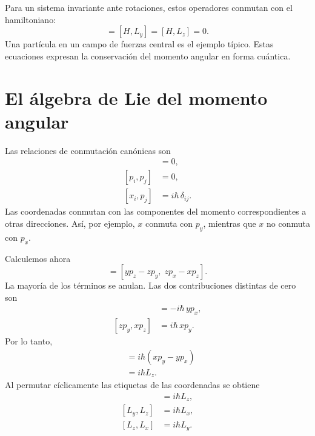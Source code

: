 Para un sistema invariante ante rotaciones, estos operadores conmutan con el hamiltoniano:
\begin{equation}
[H,L_x]=[H,L_y]=[H,L_z]=0.
\end{equation}
Una partícula en un campo de fuerzas central es el ejemplo típico. Estas ecuaciones expresan la conservación del momento angular en forma cuántica.

\section{El álgebra de Lie del momento angular}

Las relaciones de conmutación canónicas son
\begin{align}
[x_i,x_j]&=0,\\
[p_i,p_j]&=0,\\
[x_i,p_j]&=i\hbar\,\delta_{ij}.
\end{align}
Las coordenadas conmutan con las componentes del momento correspondientes a otras direcciones. Así, por ejemplo, \(x\) conmuta con \(p_y\), mientras que \(x\) no conmuta con \(p_x\).

Calculemos ahora
\begin{equation}
[L_x,L_y]
=
[yp_z-zp_y,\;zp_x-xp_z].
\end{equation}
La mayoría de los términos se anulan. Las dos contribuciones distintas de cero son
\begin{align}
[yp_z,zp_x]&=-i\hbar\,yp_x,\\
[zp_y,xp_z]&=i\hbar\,xp_y.
\end{align}
Por lo tanto,
\begin{align}
[L_x,L_y]
&=i\hbar\left(xp_y-yp_x\right)\\
&=i\hbar L_z.
\end{align}
Al permutar cíclicamente las etiquetas de las coordenadas se obtiene
\begin{align}
[L_x,L_y]&=i\hbar L_z,\\
[L_y,L_z]&=i\hbar L_x,\\
[L_z,L_x]&=i\hbar L_y.
\end{align}

\begin{classroomqa}
\end{classroomqa}

